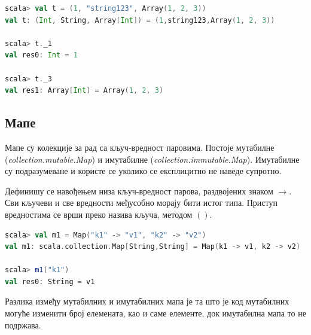\documentclass[12pt,oneside]{memoir}
\begin{document}
\begin{lstlisting}[language=Scala, caption={Пример \textit{N}-торке у Скали}, label={lst:scala_coll_tuple_example}]
scala> val t = (1, "string123", Array(1, 2, 3))
val t: (Int, String, Array[Int]) = (1,string123,Array(1, 2, 3))

scala> t._1
val res0: Int = 1

scala> t._3
val res1: Array[Int] = Array(1, 2, 3)
\end{lstlisting}

\subsection{Мапе}
\label{subsec:scala_maps}

Мапе су колекције за рад са кључ-вредност паровима. Постоје мутабилне (\textit{collection.mutable.Map}) и имутабилне (\textit{collection.immutable.Map}). Имутабилне су подразумеване и користе се уколико се експлицитно не наведе супротно.

Дефинишу се навођењем низа кључ-вредност парова, раздвојених знаком $\rightarrow$. Сви кључеви и све вредности међусобно морају бити истог типа. Приступ вредностима се врши преко назива кључа, методом $()$.

\begin{lstlisting}[language=Scala, caption={Пример мапе у Скали}, label={lst:scala_app_maps_example}]
scala> val m1 = Map("k1" -> "v1", "k2" -> "v2")
val m1: scala.collection.Map[String,String] = Map(k1 -> v1, k2 -> v2)

scala> m1("k1")
val res0: String = v1

\end{lstlisting}

Разлика између мутабилних и имутабилних мапа је та што је код мутабилних могуће изменити број елемената, као и саме елементе, док имутабилна мапа то не подржава.
\end{document}
